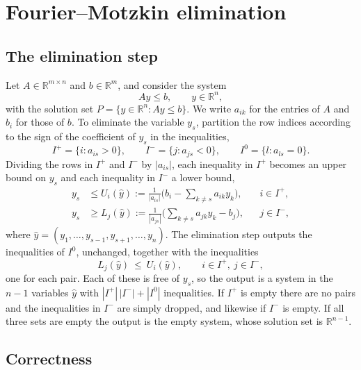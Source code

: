 \documentclass[11pt]{article}
\theoremstyle{definition}
\newcommand{\Ipos}{I^{+}}
\newcommand{\Ineg}{I^{-}}
\newcommand{\Izero}{I^{0}}
\begin{document}
\section{Fourier--Motzkin elimination}
\label{sec:fm}

\subsection{The elimination step}
\label{sec:fmstep}

Let $A\in\mathbb{R}^{m\times n}$ and $b\in\mathbb{R}^{m}$, and consider the system
\begin{equation}
Ay \le b, \qquad y\in\mathbb{R}^{n},
\label{eq:system}
\end{equation}
with the solution set $P=\{y\in\mathbb{R}^{n} : Ay\le b\}$. We write $a_{ik}$ for the entries of $A$ and $b_i$ for those of $b$. To eliminate the variable $y_s$, partition the row indices according to the sign of the coefficient of $y_s$ in the inequalities,
\begin{equation}
\Ipos=\{i: a_{is}>0\},\qquad \Ineg=\{j: a_{js}<0\},\qquad \Izero=\{l: a_{ls}=0\}.
\end{equation}
Dividing the rows in $\Ipos$ and $\Ineg$ by $|a_{is}|$, each inequality in $\Ipos$ becomes an upper bound on $y_s$ and each inequality in $\Ineg$ a lower bound,
\begin{align}
y_s &\le U_i(\hat y):=\frac{1}{|a_{is}|}\Big(b_i-\sum_{k\neq s}a_{ik}y_k\Big), && i\in\Ipos, \label{eq:upper}\\
y_s &\ge L_j(\hat y):=\frac{1}{|a_{js}|}\Big(\sum_{k\neq s}a_{jk}y_k-b_j\Big), && j\in\Ineg, \label{eq:lower}
\end{align}
where $\hat y=(y_1,\dots,y_{s-1},y_{s+1},\dots,y_n)$. The elimination step outputs the inequalities of $\Izero$, unchanged, together with the inequalities
\begin{equation}
L_j(\hat y)\ \le\ U_i(\hat y), \qquad i\in\Ipos,\ j\in\Ineg,
\label{eq:pairs}
\end{equation}
one for each pair. Each of these is free of $y_s$, so the output is a system in the $n-1$ variables $\hat y$ with $|\Ipos|\,|\Ineg|+|\Izero|$ inequalities. If $\Ipos$ is empty there are no pairs and the inequalities in $\Ineg$ are simply dropped, and likewise if $\Ineg$ is empty. If all three sets are empty the output is the empty system, whose solution set is $\mathbb{R}^{n-1}$.

\subsection{Correctness}
\label{sec:correctness}
\end{document}
